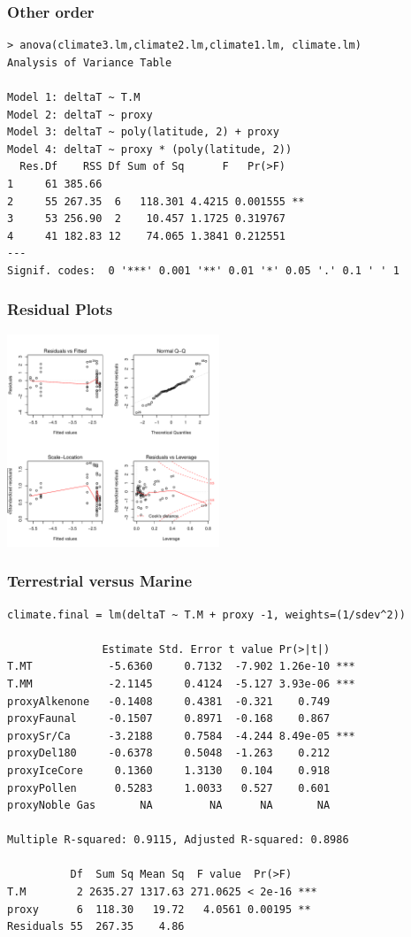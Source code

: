 \documentclass[handout]{beamer}
\begin{document}
\begin{frame}[fragile]
  \frametitle{Other order}
 \begin{small}
\begin{verbatim}
> anova(climate3.lm,climate2.lm,climate1.lm, climate.lm)
Analysis of Variance Table

Model 1: deltaT ~ T.M
Model 2: deltaT ~ proxy
Model 3: deltaT ~ poly(latitude, 2) + proxy
Model 4: deltaT ~ proxy * (poly(latitude, 2))
  Res.Df    RSS Df Sum of Sq      F   Pr(>F)   
1     61 385.66                                
2     55 267.35  6   118.301 4.4215 0.001555 **
3     53 256.90  2    10.457 1.1725 0.319767   
4     41 182.83 12    74.065 1.3841 0.212551   
---
Signif. codes:  0 '***' 0.001 '**' 0.01 '*' 0.05 '.' 0.1 ' ' 1 
\end{verbatim}
  \end{small}
\end{frame}
\begin{frame} \frametitle{Residual Plots}

\centerline{\includegraphics[height=2.5in]{resid}}
\end{frame}

\begin{frame}[fragile]
  \frametitle{Terrestrial versus Marine}
\begin{small}
\begin{verbatim}
climate.final = lm(deltaT ~ T.M + proxy -1, weights=(1/sdev^2))

               Estimate Std. Error t value Pr(>|t|)    
T.MT            -5.6360     0.7132  -7.902 1.26e-10 ***
T.MM            -2.1145     0.4124  -5.127 3.93e-06 ***
proxyAlkenone   -0.1408     0.4381  -0.321    0.749    
proxyFaunal     -0.1507     0.8971  -0.168    0.867    
proxySr/Ca      -3.2188     0.7584  -4.244 8.49e-05 ***
proxyDel180     -0.6378     0.5048  -1.263    0.212    
proxyIceCore     0.1360     1.3130   0.104    0.918    
proxyPollen      0.5283     1.0033   0.527    0.601    
proxyNoble Gas       NA         NA      NA       NA    

Multiple R-squared: 0.9115,	Adjusted R-squared: 0.8986 

          Df  Sum Sq Mean Sq  F value  Pr(>F)    
T.M        2 2635.27 1317.63 271.0625 < 2e-16 ***
proxy      6  118.30   19.72   4.0561 0.00195 ** 
Residuals 55  267.35    4.86                     
\end{verbatim}
\end{small}
\end{frame}
\end{document}
